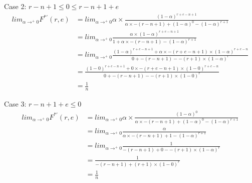 \documentclass[12pt]{dalcsthesis}
\begin{document}
Case 2: $r-n+1 \leq 0 \leq r-n+1+e$ 
\begin{align*}
lim_{\alpha \rightarrow^{+} 0} F^{*'}(r, e)
  &= lim_{\alpha \rightarrow^{+} 0} \alpha \times \frac{(1-\alpha)^{r + e - n + 1}}{\alpha \times -(r-n+1) + (1-\alpha)^0 - (1-\alpha)^{r+1}}
\\&= lim_{\alpha \rightarrow^{+} 0} \frac{\alpha \times (1-\alpha)^{r + e - n + 1}}{1 + \alpha \times -(r-n+1) - (1-\alpha)^{r+1}}
\\&= lim_{\alpha \rightarrow^{+} 0} \frac{(1-\alpha)^{r + e - n + 1} + \alpha \times -(r + e - n + 1) \times (1-\alpha)^{r + e - n}}{0 + -(r-n+1) - -(r+1) \times (1-\alpha)^r}
\\&= \frac{(1-0)^{r + e - n + 1} + 0 \times -(r + e - n + 1) \times (1-0)^{r + e - n}}{0 + -(r-n+1) - -(r+1) \times (1-0)^r}
\\&= \frac{1}{n}
\end{align*} 

Case 3: $r-n+1+e \leq 0$ 
\begin{align*}
lim_{\alpha \rightarrow^{+} 0} F^{*'}(r, e)
  &= lim_{\alpha \rightarrow^{+} 0} \alpha \times \frac{(1-\alpha)^0}{\alpha \times -(r-n+1) + (1-\alpha)^0 - (1-\alpha)^{r+1}}
\\&= lim_{\alpha \rightarrow^{+} 0} \frac{\alpha}{\alpha \times -(r-n+1) + 1 - (1-\alpha)^{r+1}}
\\&= lim_{\alpha \rightarrow^{+} 0} \frac{1}{-(r-n+1) + 0 - -(r+1) \times (1-\alpha)^r}
\\&= \frac{1}{-(r-n+1) + (r+1) \times (1-0)^r}
\\&= \frac{1}{n}
\end{align*} 
\end{document}
